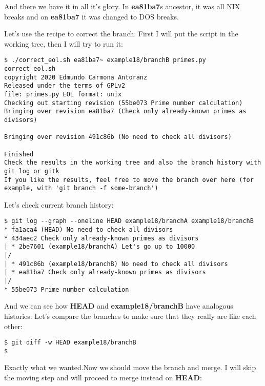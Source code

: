 And there we have it in all it's glory. In {\bf ea81ba7}s ancestor, it was all NIX breaks and on {\bf ea81ba7} it was changed to DOS breaks.

Let's use the recipe to correct the branch. First I will put the script in the working tree, then I will try to run it:

\begin{lstlisting}[style=console_style,
	basicstyle=\small,
	caption={\bf example 18} - running recipe script]
$ ./correct_eol.sh ea81ba7~ example18/branchB primes.py
correct_eol.sh
copyright 2020 Edmundo Carmona Antoranz
Released under the terms of GPLv2
file: primes.py EOL format: unix
Checking out starting revision (55be073 Prime number calculation)
Bringing over revision ea81ba7 (Check only already-known primes as divisors)

Bringing over revision 491c86b (No need to check all divisors)

Finished
Check the results in the working tree and also the branch history with git log or gitk
If you like the results, feel free to move the branch over here (for example, with 'git branch -f some-branch')
\end{lstlisting}

Let's check current branch history:

\begin{lstlisting}[style=console_style,
	basicstyle=\small,
	caption={\bf example 18} - running recipe script]
$ git log --graph --oneline HEAD example18/branchA example18/branchB
* fa1aca4 (HEAD) No need to check all divisors
* 434aec2 Check only already-known primes as divisors
| * 2be7601 (example18/branchA) Let's go up to 10000
|/  
| * 491c86b (example18/branchB) No need to check all divisors
| * ea81ba7 Check only already-known primes as divisors
|/  
* 55be073 Prime number calculation
\end{lstlisting}

And we can see how {\bf HEAD} and {\bf example18/branchB} have analogous histories. Let's compare the branches to
make sure that they really are like each other:

\begin{lstlisting}[style=console_style,
	basicstyle=\small,
	caption={\bf example 18} - comparing results]
$ git diff -w HEAD example18/branchB
$
\end{lstlisting}

Exactly what we wanted.Now we should move the branch and merge. I will skip the moving step and will proceed to merge instead on
{\bf HEAD}:

